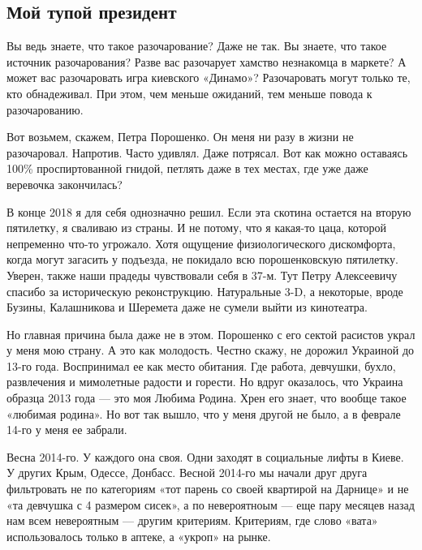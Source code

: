  
 
 

\subsection{Мой тупой президент}
\label{sec:01_11_2020.fb.igor_lesev.1.moj_tupoj_prezident}

Вы ведь знаете, что такое разочарование?  Даже не так. Вы знаете, что такое
источник разочарования? Разве вас разочарует хамство незнакомца в маркете? А
может вас разочаровать игра киевского «Динамо»? Разочаровать могут только те,
кто обнадеживал. При этом, чем меньше ожиданий, тем меньше повода к
разочарованию.

Вот возьмем, скажем, Петра Порошенко. Он меня ни разу в жизни не разочаровал.
Напротив. Часто удивлял. Даже потрясал. Вот как можно оставаясь 100\%
проспиртованной гнидой, петлять даже в тех местах, где уже даже веревочка
закончилась?

В конце 2018 я для себя однозначно решил. Если эта скотина остается на вторую
пятилетку, я сваливаю из страны. И не потому, что я какая-то цаца, которой
непременно что-то угрожало. Хотя ощущение физиологического дискомфорта, когда
могут загасить у подъезда, не покидало всю порошенковскую пятилетку. Уверен,
также наши прадеды чувствовали себя в 37-м. Тут Петру Алексеевичу спасибо за
историческую реконструкцию. Натуральные 3-D, а некоторые, вроде Бузины,
Калашникова и Шеремета даже не сумели выйти из кинотеатра.

Но главная причина была даже не в этом. Порошенко с его сектой расистов украл у
меня мою страну. А это как молодость. Честно скажу, не дорожил Украиной до
13-го года. Воспринимал ее как место обитания. Где работа, девчушки, бухло,
развлечения и мимолетные радости и горести. Но вдруг оказалось, что Украина
образца 2013 года --- это моя Любима Родина. Хрен его знает, что вообще такое
«любимая родина». Но вот так вышло, что у меня другой не было, а в феврале
14-го у меня ее забрали.

Весна 2014-го. У каждого она своя. Одни заходят в социальные лифты в Киеве. У
других Крым, Одессе, Донбасс. Весной 2014-го мы начали друг друга фильтровать
не по категориям «тот парень со своей квартирой на Дарнице» и не «та девчушка с
4 размером сисек», а по невероятноым --- еще пару месяцев назад нам всем
невероятным --- другим критериям. Критериям, где слово «вата» использовалось
только в аптеке, а «укроп» на рынке.

